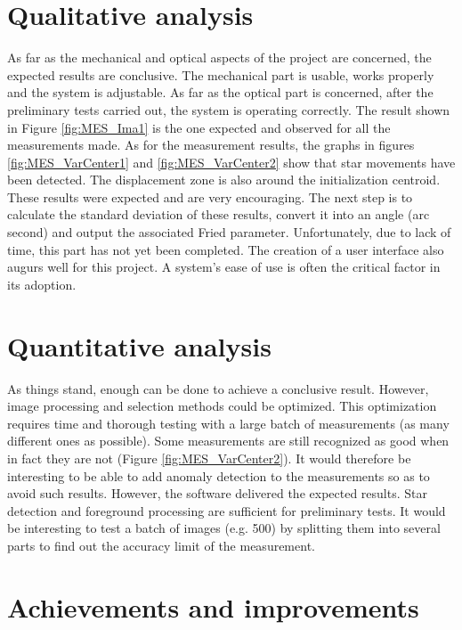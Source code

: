 \section{Qualitative analysis}\label{sec:ANAL_Pos}
As far as the mechanical and optical aspects of the project are concerned, the expected results are conclusive.
The mechanical part is usable, works properly and the system is adjustable.
As far as the optical part is concerned, after the preliminary tests carried out, the system is operating correctly.
The result shown in Figure \ref{fig:MES_Ima1} is the one expected and observed for all the measurements made.
\bigbreak
As for the measurement results, the graphs in figures \ref{fig:MES_VarCenter1} and \ref{fig:MES_VarCenter2} show that star
movements have been detected.
The displacement zone is also around the initialization centroid.
These results were expected and are very encouraging.
\newline
The next step is to calculate the standard deviation of these results, convert it into an angle (arc second) and output the associated
Fried parameter. Unfortunately, due to lack of time, this part has not yet been completed.
\newline
The creation of a user interface also augurs well for this project. A system's ease of use is often the critical factor in its adoption.
\section{Quantitative analysis}
As things stand, enough can be done to achieve a conclusive result. However, image processing and selection methods could be optimized.
This optimization requires time and thorough testing with a large batch of measurements (as many different ones as possible).
\newline
Some measurements are still recognized as good when in fact they are not (Figure \ref{fig:MES_VarCenter2}).
It would therefore be interesting to be able to add anomaly detection to the measurements so as to avoid such results. \newline
However, the software delivered the expected results. Star detection and foreground processing are sufficient for preliminary tests.
It would be interesting to test a batch of images (e.g. 500) by splitting them into several parts to find out the accuracy limit
of the measurement.
\newpage
\section{Achievements and improvements}

